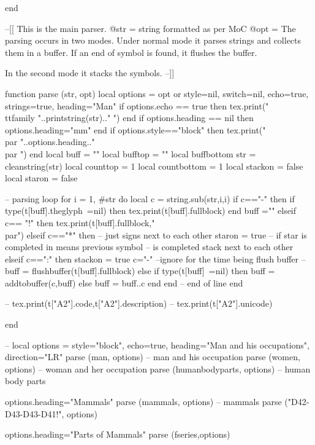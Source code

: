 \documentclass{article}
\begin{document}
\begin{luacode*}
end



--[[
This is the main parser. 
@str = string formatted as per MoC 
@opt = 
The parsing occurs in two modes. Under normal mode
it parses strings and collects them in a buffer. If an
end of symbol is found, it flushes the buffer.

In the second mode it stacks the symbols.
--]]

function parse (str, opt) 
  local options = opt or {style=nil,
                    switch=nil,
                    echo=true,
                    strings=true,
                    heading="Man"}
  if options.echo == true then tex.print("{\\ttfamily "..printstring(str).." }") end
  if options.heading == nil then options.heading="mm" end
  if options.style=="block" then  
     tex.print("\\par "..options.heading.."\\par ") 
  end
  local buff = ""
  local bufftop = "" 
  local buffbottom
  str = cleanstring(str)
  local counttop = 1
  local countbottom = 1
  local stackon = false
  local staron = false

-- parsing loop
  for i = 1, #str do
    local c = string.sub(str,i,i) 
    if c=="-" then 
       if type(t[buff].theglyph~=nil) then
         tex.print(t[buff].fullblock)
       end
       buff =""
     elseif c== "!" then
       tex.print(t[buff].fullblock,"\\par")
     elseif c=="*" then -- just signs next to each other
       staron = true
       -- if star is completed in means previous symbol
       -- is completed stack next to each other
     elseif c==":" then
         stackon = true
         c="-" --ignore for the time being flush buffer
		   --buff = flushbuffer(t[buff].fullblock)
     else 
       if type(t[buff]~=nil) then
            buff = addtobuffer(c,buff)
       else
            buff = buff..c
       end
  end
    -- end of line
  end

-- tex.print(t["A2"].code,t["A2"].description)
-- tex.print(t["A2"].unicode)

end

-- 
local options = {style="block",
                 echo=true,
                 heading="Man and his occupations",
                 direction="LR"}
parse (man, options)            -- man and his occupation
parse (women, options)          -- woman and her occupation
parse (humanbodyparts, options) -- human body parts

options.heading="Mammals"
parse (mammals, options)        -- mammals
parse ("D42-D43-D43-D41!", options)

options.heading="Parts of Mammals"
parse (fseries,options)
\end{luacode*}
\end{document}
